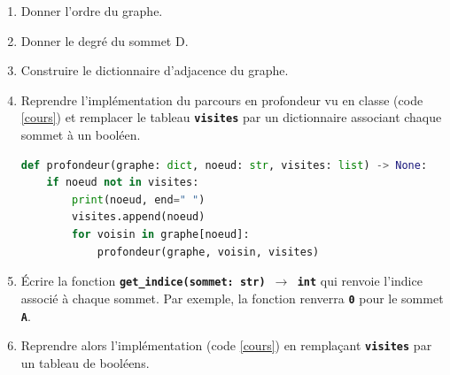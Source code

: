 \documentclass[a4paper,11pt]{article}
\begin{document}
\begin{exo}
    \begin{center}
    \end{center}
    \begin{enumerate}
        \item Donner l'ordre du graphe.
        \item Donner le degré du sommet D.
        \item Construire le dictionnaire d'adjacence du graphe.
        \item Reprendre l'implémentation du parcours en profondeur vu en classe (code \ref{cours}) et remplacer le tableau \textbf{\texttt{visites}} par un dictionnaire associant chaque sommet à un booléen.
    \begin{center}
        \begin{lstlisting}[language=Python  , xleftmargin=2em, xrightmargin=2em]
def profondeur(graphe: dict, noeud: str, visites: list) -> None:
    if noeud not in visites:
        print(noeud, end=" ")
        visites.append(noeud)
        for voisin in graphe[noeud]:
            profondeur(graphe, voisin, visites)
\end{lstlisting}
                  \label{cours}
    \end{center}
    \item Écrire la fonction \textbf{\texttt{get\_indice(sommet: str) $\rightarrow$ int}} qui renvoie l'indice associé à chaque sommet. Par exemple, la fonction renverra \textbf{\texttt{0}} pour le sommet \textbf{\texttt{A}}.
    \item Reprendre alors l'implémentation (code \ref{cours}) en remplaçant \textbf{\texttt{visites}} par un tableau de booléens.
    \end{enumerate}

\end{exo}
\end{document}
